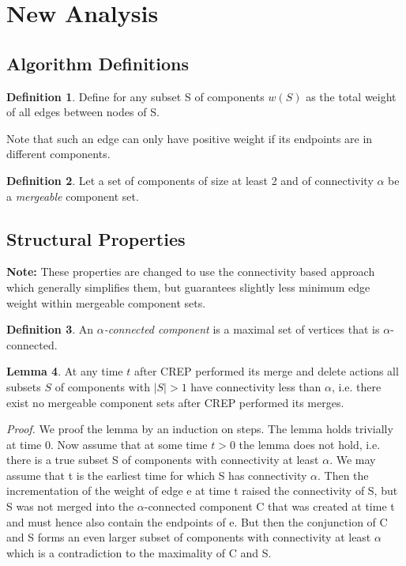 \documentclass[xcolor=dvipsnames, tikz, 12pt]{article}
\newcommand{\nl}{\newline}
\newcommand{\crep}{C{\scriptsize REP}}
\theoremstyle{definition}
\newtheorem{defi}{Definition}
\newtheorem{lemma}[defi]{Lemma}
\begin{document}
	

\section{New Analysis}

\subsection{Algorithm Definitions}

\begin{defi}
	Define for any subset S of components $w(S)$ as the total weight of all edges between nodes of S.
\end{defi}
Note that such an edge can only have positive weight if its endpoints are in different components.

\begin{defi}
	Let a set of components of size at least 2 and of connectivity $\alpha$ be a \textit{mergeable} component set.	
\end{defi}


\subsection{Structural Properties}


\textbf{Note:} These properties are changed to use the connectivity based approach which generally simplifies them, but guarantees slightly less minimum edge weight within mergeable component sets.
\begin{defi}
	An $\alpha$\textit{-connected component} is a maximal set of vertices that is $\alpha$-connected.
\end{defi}

\begin{lemma}
	At any time $t$ after \crep{} performed its merge and delete actions all subsets $S$ of components with $|S|>1$ have connectivity less than $\alpha$, i.e. there exist no mergeable component sets after \crep{} performed its merges.
\end{lemma}

\textit{Proof.} We proof the lemma by an induction on steps. The lemma holds trivially at time 0.\nl
Now assume that at some time $t>0$ the lemma does not hold, i.e. there is a true subset S of components with connectivity at least $\alpha$. We may assume that t is the earliest time for which S has connectivity $\alpha$.\nl 
Then the incrementation of the weight of edge e at time t raised the connectivity of S, but S was not merged into the $\alpha$-connected component C that was created at time t and must hence also contain the endpoints of e. But then the conjunction of C and S forms an even larger subset of components with connectivity at least $\alpha$ which is a contradiction to the maximality of C and S. 
\end{document}
